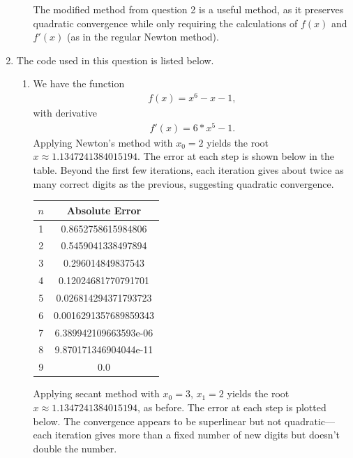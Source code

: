 \documentclass[10pt]{article}
\begin{document}
\begin{enumerate}
\begin{enumerate}
    The modified method from question 2 is a useful method, as it preserves quadratic convergence while only requiring the calculations of \(f(x)\) and \(f'(x)\) (as in the regular Newton method).

    {\small }
    \newpage
  \end{enumerate}

  \item The code used in this question is listed below.
  \begin{enumerate}
    \item We have the function \begin{align*}
        f(x) = x^6 -x - 1,
    \end{align*} with derivative \begin{align*}
        f'(x) = 6*x^5 - 1.
    \end{align*} Applying Newton's method with \(x_0 = 2\) yields the root \(x \approx 1.1347241384015194\). The error at each step is shown below in the table. Beyond the first few iterations, each iteration gives about twice as many correct digits as the previous, suggesting quadratic convergence.

    \begin{center}
      \begin{tabular}{c|c}
        $n$ & Absolute Error \\
        \hline 
        1  &  0.8652758615984806 \\
2  &  0.5459041338497894 \\
3  &  0.296014849837543 \\
4  &  0.12024681770791701 \\
5  &  0.026814294371793723 \\
6  &  0.0016291357689859343 \\
7  &  6.389942109663593e-06 \\
8  &  9.870171346904044e-11 \\
9  &  0.0 \\
      \end{tabular}
    \end{center}

    Applying secant method with \(x_0=3\), \(x_1=2\) yields the root \(x \approx 1.1347241384015194\), as before. The error at each step is plotted below. The convergence appears to be superlinear but not quadratic---each iteration gives more than a fixed number of new digits but doesn't double the number.


\end{enumerate}
\end{enumerate}
\end{document}
